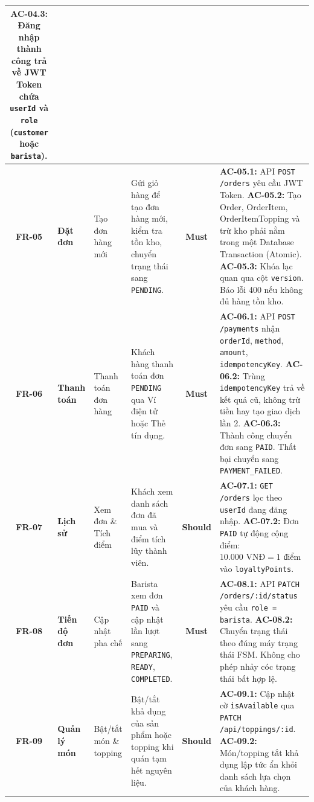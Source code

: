 \documentclass[12pt,a4paper]{article}
\begin{document}
\begin{table}[H]
\begin{tabularx}{\textwidth}{|c|>{\raggedright\arraybackslash}p{2cm}|>{\raggedright\arraybackslash}p{2.8cm}|>{\raggedright\arraybackslash}p{3cm}|c|>{\raggedright\arraybackslash}X|}
\textbf{AC-04.3:} Đăng nhập thành công trả về JWT Token chứa \texttt{userId} và \texttt{role} (\texttt{customer} hoặc \texttt{barista}). \\
\hline
\textbf{FR-05} & \textbf{Đặt đơn} & Tạo đơn hàng mới & Gửi giỏ hàng để tạo đơn hàng mới, kiểm tra tồn kho, chuyển trạng thái sang \texttt{PENDING}. & \textbf{Must} & 
\textbf{AC-05.1:} API \texttt{POST /orders} yêu cầu JWT Token.\newline
\textbf{AC-05.2:} Tạo Order, OrderItem, OrderItemTopping và trừ kho phải nằm trong một Database Transaction (Atomic).\newline
\textbf{AC-05.3:} Khóa lạc quan qua cột \texttt{version}. Báo lỗi 400 nếu không đủ hàng tồn kho. \\
\hline
\textbf{FR-06} & \textbf{Thanh toán} & Thanh toán đơn hàng & Khách hàng thanh toán đơn \texttt{PENDING} qua Ví điện tử hoặc Thẻ tín dụng. & \textbf{Must} & 
\textbf{AC-06.1:} API \texttt{POST /payments} nhận \texttt{orderId}, \texttt{method}, \texttt{amount}, \texttt{idempotencyKey}.\newline
\textbf{AC-06.2:} Trùng \texttt{idempotencyKey} trả về kết quả cũ, không trừ tiền hay tạo giao dịch lần 2.\newline
\textbf{AC-06.3:} Thành công chuyển đơn sang \texttt{PAID}. Thất bại chuyển sang \texttt{PAYMENT\_FAILED}. \\
\hline
\textbf{FR-07} & \textbf{Lịch sử} & Xem đơn \& Tích điểm & Khách xem danh sách đơn đã mua và điểm tích lũy thành viên. & \textbf{Should} & 
\textbf{AC-07.1:} \texttt{GET /orders} lọc theo \texttt{userId} đang đăng nhập.\newline
\textbf{AC-07.2:} Đơn \texttt{PAID} tự động cộng điểm: $10.000\text{ VNĐ} = 1\text{ điểm}$ vào \texttt{loyaltyPoints}. \\
\hline
\textbf{FR-08} & \textbf{Tiến độ đơn} & Cập nhật pha chế & Barista xem đơn \texttt{PAID} và cập nhật lần lượt sang \texttt{PREPARING}, \texttt{READY}, \texttt{COMPLETED}. & \textbf{Must} & 
\textbf{AC-08.1:} API \texttt{PATCH /orders/:id/status} yêu cầu \texttt{role = barista}.\newline
\textbf{AC-08.2:} Chuyển trạng thái theo đúng máy trạng thái FSM. Không cho phép nhảy cóc trạng thái bất hợp lệ. \\
\hline
\textbf{FR-09} & \textbf{Quản lý món} & Bật/tắt món \& topping & Bật/tắt khả dụng của sản phẩm hoặc topping khi quán tạm hết nguyên liệu. & \textbf{Should} & 
\textbf{AC-09.1:} Cập nhật cờ \texttt{isAvailable} qua \texttt{PATCH /api/toppings/:id}.\newline
\textbf{AC-09.2:} Món/topping tắt khả dụng lập tức ẩn khỏi danh sách lựa chọn của khách hàng. \\
\hline
\end{tabularx}
\end{table}
\end{document}
